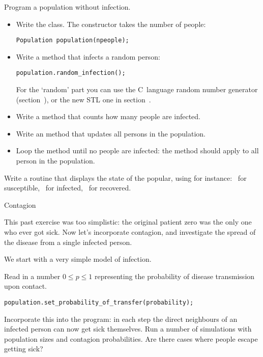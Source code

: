\begin{exercise}
  \label{ex:infect:notransfer}
  Program a population without infection.
  \begin{itemize}
  \item Write the  class. The constructor takes the number of people:
\begin{lstlisting}
Population population(npeople);  
\end{lstlisting}
  \item Write a method that infects a random person:
\begin{lstlisting}
population.random_infection();
\end{lstlisting}
For the `random' part you can use the C~language random number generator
(section~),
or the new \ac{STL} one in section~.
  \item Write a method  that counts how many people are infected.
  \item Write an  method that updates all persons in the population.
  \item Loop the  method until no people are infected: the
     method should apply  to
    all person in the population.
  \end{itemize}
\item Write a routine that displays the state of the popular, using
  for instance: ~for susceptible, \n{+}~for infected, \n{-}~for recovered.
\end{exercise}

 {Contagion}

This past exercise was too simplistic: the original patient zero was
the only one who ever got sick.
Now let's incorporate contagion, and investigate the spread of the disease
from a single infected person.

We start with a very simple model of infection.

\begin{exercise}
  \label{ex:infect:1}
  Read in a number $0\leq p \leq 1$ representing the probability of
  disease transmission upon contact.
\begin{lstlisting}
population.set_probability_of_transfer(probability);  
\end{lstlisting}
  Incorporate this into the
  program: in each step the direct neighbours of an infected person
  can now get sick themselves.
  Run a number of simulations with population sizes and contagion
  probabilities. Are there cases where people escape getting sick?
\end{exercise}

